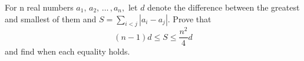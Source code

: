 For n real numbers $a_{1},\, a_{2},\, \ldots\, , a_{n},$ let $d$ denote the difference between the greatest and smallest of them and $S = \sum_{i<j}\left |a_i-a_j \right|.$ Prove that \[(n-1)d\le S\le\frac{n^{2}}{4}d\] and find when each equality holds.